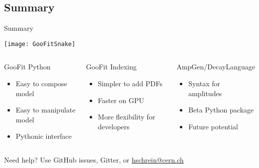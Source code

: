 \documentclass[aspectratio=169, smaller]{beamer}
\begin{document}
\subsection{Summary}
\begin{frame}{Summary}
    \begin{center}
        \texttt{[image: GooFitSnake]}
    \end{center}
    \begin{columns}[t]
        \begin{block}{GooFit Python}
            \begin{itemize}
                \item Easy to compose model
                \item Easy to manipulate model
                \item Pythonic interface
            \end{itemize}
        \end{block}
        \begin{block}{GooFit Indexing}
            \begin{itemize}
                \item Simpler to add PDFs
                \item Faster on GPU
                \item More flexibility for developers
            \end{itemize}
        \end{block}
        \begin{block}{AmpGen/DecayLanguage}
            \begin{itemize}
                \item Syntax for amplitudes
                \item Beta Python package
                \item Future potential
            \end{itemize}
        \end{block}
    \end{columns}

    \begin{center}
        Need help? Use GitHub issues, Gitter, or
        \href{mailto:hschrein@cern.ch}{hschrein@cern.ch}
    \end{center}
\end{frame}


\backupbegin
\end{document}

